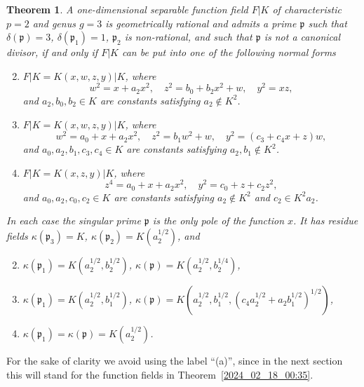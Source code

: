 \documentclass[12pt,reqno]{amsart}
\newtheorem{thm}{Theorem}[section]
\theoremstyle{definition}
\newcommand{\pp}{\mathfrak{p}}
\newcommand{\de}{\delta}
\newcommand{\ka}{\kappa}
\begin{document}
\begin{thm}\label{2021_05_21_18:40}
A one-dimensional separable function field $F|K$ of characteristic $p=2$ and genus $g = 3$ is geometrically rational and admits a prime $\pp$ such that $\de(\pp) = 3$, $\de(\pp_1) = 1$, $\pp_2$ is non-rational, and such that $\pp$ is not a canonical divisor, if and only if 
$F|K$ can be put into one of the following normal forms
\begin{enumerate}[\upshape (a)]
    \setcounter{enumi}{1}
    \item \label{2021_05_21_18:42}
    $F|K = K(x,w,z,y)|K$, where
    \[ w^2 = x + a_2 x^2, \quad z^2 = b_0 + b_2 x^2 + w, \quad y^2 = xz, \]
    and $a_2,b_0,b_2 \in K$ are constants satisfying $a_2 \notin K^2$.
    
    \item \label{2021_05_21_18:43}
    $F|K = K(x,w,z,y)|K$, where
    \[ w^2 = a_ 0 + x + a_2 x^2, \quad z^2 = b_1 w^2 + w, \quad y^2 = (c_3 + c_4 x + z) w, \]
    and $a_0,a_2,b_1,c_3,c_4 \in K$ are constants satisfying $a_2,b_1 \notin K^2$.

    \item \label{2021_05_21_18:45}
    $F|K = K(x,z,y)|K$, where    
    \[ z^4 = a_0 + x + a_2 x^2, \quad y^2 = c_0 + z + c_2 z^2, \]
    and $a_0,a_2,c_0,c_2 \in K$ are constants satisfying $a_2\notin K^2$ and $c_2 \in K^2 a_2$.
\end{enumerate}
In each case the singular prime $\pp$ is the only pole of the function $x$.
It has residue fields $\ka(\pp_3) = K$, $\ka(\pp_2) = K(a_2^{1/2})$,
and
\begin{enumerate}[\upshape (a)]
    \setcounter{enumi}{1}
    \item $\ka({\pp_1}) = K(a_2^{1/2}, b_2^{1/2})$, $\ka(\pp) = K(a_2^{1/2}, b_2^{1/4})$,
    \item $\ka({\pp_1}) = K(a_2^{1/2}, b_1^{1/2})$, $\ka(\pp) = K(a_2^{1/2}, b_1^{1/2}, (c_4 a_2^{1/2} + a_2 b_1^{1/2})^{1/2})$,
    \item $\ka(\pp_1) = \ka(\pp) = K(a_2^{1/2})$.
\end{enumerate}
\end{thm}

For the sake of clarity we avoid using the label ``(a)'', since in the next section this will stand for the function fields in Theorem~\ref{2024_02_18_00:35}.
\end{document}
